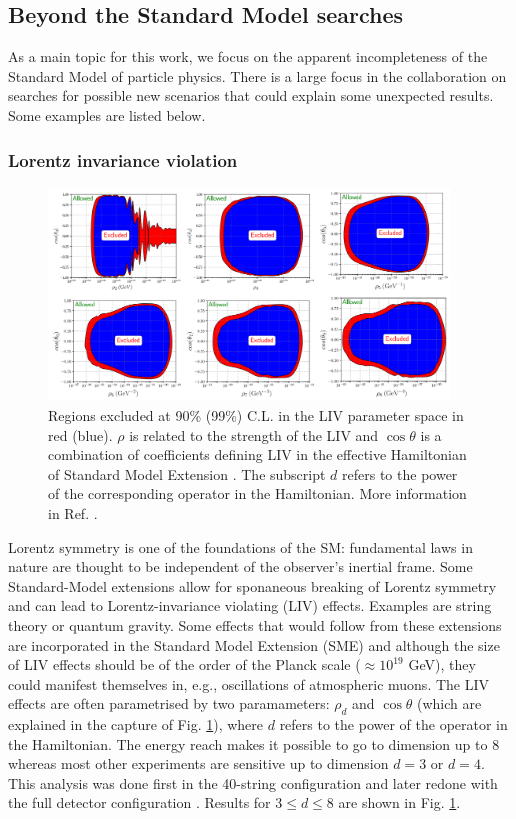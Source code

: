 \subsection{Beyond the Standard Model searches}
As a main topic for this work, we focus on the apparent incompleteness of the Standard Model of particle physics. There is a large focus in the collaboration on searches for possible new scenarios that could explain some unexpected results. Some examples are listed below.

\subsubsection{Lorentz invariance violation}

\begin{figure}[ht]
\centering
\includegraphics[width=0.95\textwidth]{chapter5/img/LV.png}
\caption{Regions excluded at 90\% (99\%) C.L. in the LIV parameter space in red (blue). $\rho$ is related to the strength of the LIV and $\cos \theta$ is a combination of coefficients defining LIV in the effective Hamiltonian of Standard Model Extension \cite{Colladay:1998fq}. The subscript $d$ refers to the power of the corresponding operator in the Hamiltonian. More information in Ref. \cite{Aartsen:2017ibm}.}
\label{fig:lv}
\end{figure}

Lorentz symmetry is one of the foundations of the SM: fundamental laws in nature are thought to be independent of the observer's inertial frame. Some Standard-Model extensions allow for sponaneous breaking of Lorentz symmetry and can lead to Lorentz-invariance violating (LIV) effects. Examples are string theory or quantum gravity. Some effects that would follow from these extensions are incorporated in the Standard Model Extension (SME) and although the size of LIV effects should be of the order of the Planck scale ($\approx 10^{19}$ GeV), they could manifest themselves in, e.g., oscillations of atmospheric muons. The LIV effects are often parametrised by two paramameters: $\rho_d$ and $\cos \theta$ (which are explained in the capture of Fig. \ref{fig:lv}), where $d$ refers to the power of the operator in the Hamiltonian. The energy reach makes it possible to go to dimension up to 8 whereas most other experiments are sensitive up to dimension $d=3$ or $d=4$. This analysis was done first in the 40-string configuration \cite{Abbasi:2010kx} and later redone with the full detector configuration \cite{Aartsen:2017ibm}. Results for $3 \leq d \leq 8$ are shown in Fig. \ref{fig:lv}.

